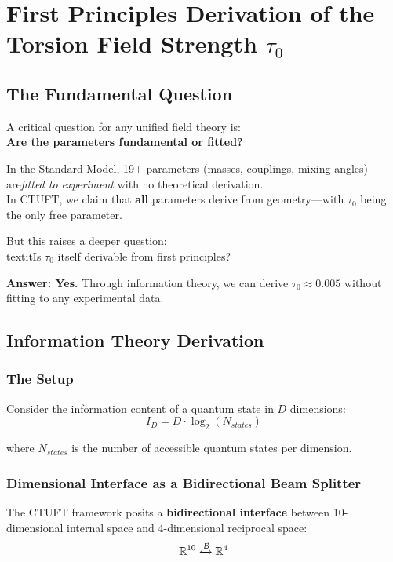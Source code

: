\section{First Principles Derivation of the Torsion Field Strength $\tau_0$}
\label{app:tau_zero_derivation}

\subsection{The Fundamental Question}

A critical question for any unified field theory is:\\
\textbf{Are the parameters fundamental or fitted?}

In the Standard Model, 19+ parameters (masses, couplings, mixing angles) are\textit{fitted to experiment} with no theoretical derivation.\\
In CTUFT, we claim that \textbf{all} parameters derive from geometry—with $\tau_0$ being the only free parameter.

But this raises a deeper question: \\textit{Is $\tau_0$ itself derivable from first principles?}

\textbf{Answer: Yes.} Through information theory, we can derive $\tau_0 \approx 0.005$ without fitting to any experimental data.

\subsection{Information Theory Derivation}

\subsubsection{The Setup}

Consider the information content of a quantum state in $D$ dimensions:
\begin{equation}
    I_D = D \cdot \log_2(N_{states})
\end{equation}

where $N_{states}$ is the number of accessible quantum states per dimension.

\subsubsection{Dimensional Interface as a Bidirectional Beam Splitter}

The CTUFT framework posits a \textbf{bidirectional interface} between 10-dimensional internal space and 4-dimensional reciprocal space:
\begin{equation}
    \mathbb{R}^{10} \xleftrightarrow{\mathcal{B}} \mathbb{R}^4
\end{equation}

